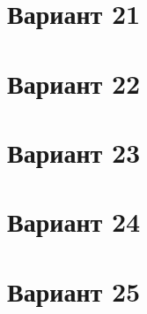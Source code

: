 \documentclass[12pt]{article}
\begin{document}
\section{Вариант 21}

\section{Вариант 22}

\section{Вариант 23}

\section{Вариант 24}

\section{Вариант 25}
\end{document}
